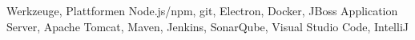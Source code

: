 \cvitem
{
  Werkzeuge, Plattformen
}
{
  Node.js/npm, git, Electron, Docker,
  JBoss Application Server, Apache Tomcat, Maven, Jenkins, SonarQube,
  Visual Studio Code, IntelliJ
}
